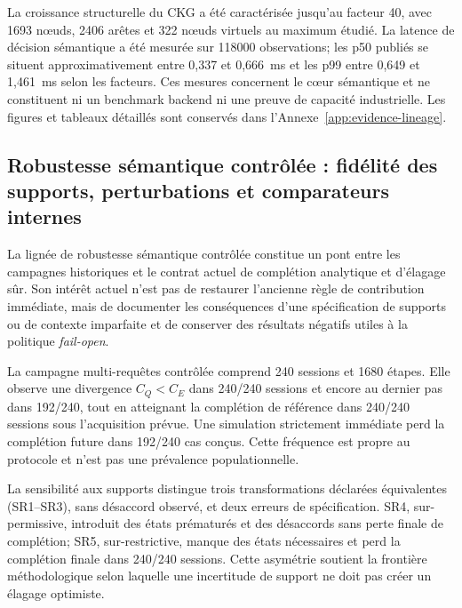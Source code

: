 \documentclass[journal]{IEEEtran}
\begin{document}


La croissance structurelle du CKG a été caractérisée jusqu'au facteur 40, avec 1693 nœuds, 2406 arêtes et 322 nœuds virtuels au maximum étudié. La latence de décision sémantique a été mesurée sur 118000 observations; les p50 publiés se situent approximativement entre 0,337 et 0,666~ms et les p99 entre 0,649 et 1,461~ms selon les facteurs. Ces mesures concernent le cœur sémantique et ne constituent ni un benchmark backend ni une preuve de capacité industrielle. Les figures et tableaux détaillés sont conservés dans l'Annexe~\ref{app:evidence-lineage}.

\subsection{Robustesse sémantique contrôlée : fidélité des supports, perturbations et comparateurs internes}

La lignée de robustesse sémantique contrôlée constitue un pont entre les campagnes historiques et le contrat actuel de complétion analytique et d'élagage sûr. Son intérêt actuel n'est pas de restaurer l'ancienne règle de contribution immédiate, mais de documenter les conséquences d'une spécification de supports ou de contexte imparfaite et de conserver des résultats négatifs utiles à la politique \emph{fail-open}.

La campagne multi-requêtes contrôlée comprend 240 sessions et 1680 étapes. Elle observe une divergence $C_Q<C_E$ dans 240/240 sessions et encore au dernier pas dans 192/240, tout en atteignant la complétion de référence dans 240/240 sessions sous l'acquisition prévue. Une simulation strictement immédiate perd la complétion future dans 192/240 cas conçus. Cette fréquence est propre au protocole et n'est pas une prévalence populationnelle.



La sensibilité aux supports distingue trois transformations déclarées équivalentes (SR1--SR3), sans désaccord observé, et deux erreurs de spécification. SR4, sur-permissive, introduit des états prématurés et des désaccords sans perte finale de complétion; SR5, sur-restrictive, manque des états nécessaires et perd la complétion finale dans 240/240 sessions. Cette asymétrie soutient la frontière méthodologique selon laquelle une incertitude de support ne doit pas créer un élagage optimiste.


\end{document}
